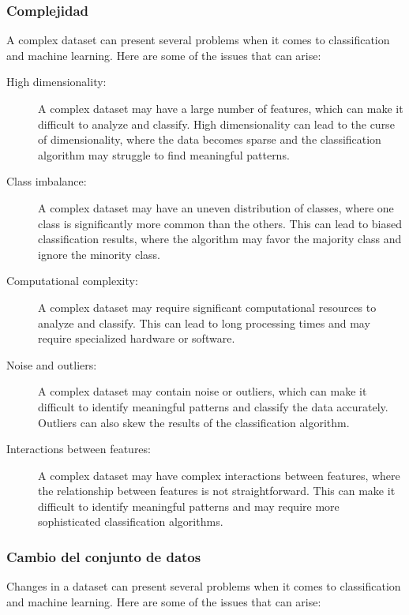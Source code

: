 \documentclass[12pt,a4paper, brazil]{article}
\begin{document}
        \subsubsection{Complejidad}
        A complex dataset can present several problems when it comes to classification and machine learning. Here are some of the issues that can arise:

    \begin{description}
  \item[High dimensionality:] A complex dataset may have a large number of features, which can make it difficult to analyze and classify. High dimensionality can lead to the curse of dimensionality, where the data becomes sparse and the classification algorithm may struggle to find meaningful patterns.
  
  \item[Class imbalance:] A complex dataset may have an uneven distribution of classes, where one class is significantly more common than the others. This can lead to biased classification results, where the algorithm may favor the majority class and ignore the minority class.
  
  \item[Computational complexity:] A complex dataset may require significant computational resources to analyze and classify. This can lead to long processing times and may require specialized hardware or software.
  
  \item[Noise and outliers:] A complex dataset may contain noise or outliers, which can make it difficult to identify meaningful patterns and classify the data accurately. Outliers can also skew the results of the classification algorithm.
  
  \item[Interactions between features:] A complex dataset may have complex interactions between features, where the relationship between features is not straightforward. This can make it difficult to identify meaningful patterns and may require more sophisticated classification algorithms.
\end{description}
    
        \subsubsection{Cambio del conjunto de datos}
Changes in a dataset can present several problems when it comes to classification and machine learning. Here are some of the issues that can arise:
\end{document}
